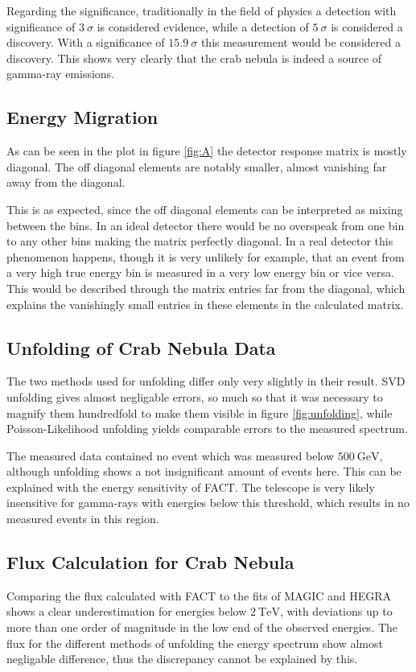             Regarding the significance, traditionally in the field of physics a detection with significance of $3\:\sigma$ is considered evidence, while a detection of $5\:\sigma$ is considered a discovery.
            With a significance of $\num{15.9}\:\sigma$ this measurement would be considered a discovery.
            This shows very clearly that the crab nebula is indeed a source of gamma-ray emissions.

        \subsection{Energy Migration}
            As can be seen in the plot in figure \ref{fig:A} the detector response matrix is mostly diagonal.
            The off diagonal elements are notably smaller, almost vanishing far away from the diagonal.
            
            This is as expected, since the off diagonal elements can be interpreted as mixing between the bins.
            In an ideal detector there would be no overspeak from one bin to any other bins making the matrix perfectly diagonal.
            In a real detector this phenomenon happens, though it is very unlikely for example, that an event from a very high true energy bin is measured in a very low energy bin or vice versa.
            This would be described through the matrix entries far from the diagonal, which explains the vanishingly small entries in these elements in the calculated matrix.
        \subsection{Unfolding of Crab Nebula Data}
            The two methods used for unfolding differ only very slightly in their result.
            SVD unfolding gives almost negligable errors, so much so that it was necessary to magnify them hundredfold to make them visible in figure \ref{fig:unfolding}, while Poisson-Likelihood unfolding yields comparable errors to the measured spectrum.
            
            The measured data contained no event which was measured below $\SI{500}{\giga\electronvolt}$, although unfolding shows a not insignificant amount of events here.
            This can be explained with the energy sensitivity of FACT.
            The telescope is very likely insensitive for gamma-rays with energies below this threshold, which results in no measured events in this region.
        \subsection{Flux Calculation for Crab Nebula}
            Comparing the flux calculated with FACT to the fits of MAGIC and HEGRA shows a clear underestimation for energies below $\SI{2}{\tera\electronvolt}$, with deviations up to more than one order of magnitude in the low end of the observed energies.
            The flux for the different methods of unfolding the energy spectrum show almost negligable difference, thus the discrepancy cannot be explained by this.

